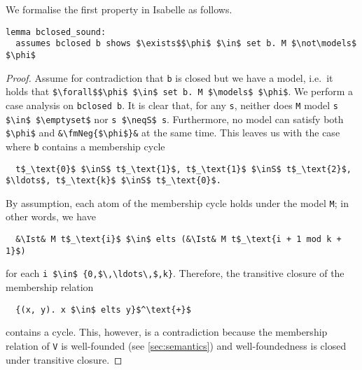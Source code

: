 \documentclass[sigplan,10pt,anonymous,review]{acmart}
\newcommand{\inS}{\in_\text{s}}
\newcommand{\neqS}{\neq_\text{s}}
\newcommand{\Ist}{I$_\text{st}$}
\newcommand{\fmNegSymbol}{\boldsymbol{\neg}}
\newcommand{\fmNeg}[1]{$\fmNegSymbol$ #1}
\begin{document}
We formalise the first property in Isabelle as follows.
\begin{lstlisting}[belowskip=0pt,label={lst:bclosed_sound}]
lemma bclosed_sound:
  assumes bclosed b shows $\exists$$\phi$ $\in$ set b. M $\not\models$ $\phi$
\end{lstlisting}
\begin{proof}
  Assume for contradiction that \lstinline!b! is closed but we have a model, i.e.\ it holds that \lstinline!$\forall$$\phi$ $\in$ set b. M $\models$ $\phi$!.
  We perform a case analysis on \lstinline!bclosed b!.
  It is clear that, for any \lstinline!s!, neither does \lstinline!M! model \lstinline!s $\in$ $\emptyset$! nor \lstinline!s $\neqS$ s!.
  Furthermore, no model can satisfy both \lstinline!$\phi$! and \lstinline!&\fmNeg{$\phi$}&! at the same time.
  This leaves us with the case where \lstinline!b! contains a membership cycle
\begin{lstlisting}
  t$_\text{0}$ $\inS$ t$_\text{1}$, t$_\text{1}$ $\inS$ t$_\text{2}$, $\ldots$, t$_\text{k}$ $\inS$ t$_\text{0}$.
\end{lstlisting}
  By assumption, each atom of the membership cycle holds under the model \lstinline!M!; in other words, we have
\begin{lstlisting}
  &\Ist& M t$_\text{i}$ $\in$ elts (&\Ist& M t$_\text{i + 1 mod k + 1}$)
\end{lstlisting}
  for each \lstinline!i $\in$ {0,$\,\ldots\,$,k}!.
  Therefore, the transitive closure of the membership relation
\begin{lstlisting}
  {(x, y). x $\in$ elts y}$^\text{+}$ 
\end{lstlisting}
  contains a cycle.
  This, however, is a contradiction because the membership relation of \lstinline!V! is well-founded (see \autoref{sec:semantics}) and well-foundedness is closed under transitive closure.
\end{proof}
\end{document}
